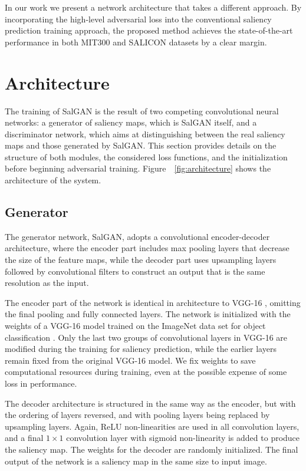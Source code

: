 \documentclass[times,twocolumn,final,authoryear]{elsarticle}
\begin{document}
In our work we present a network architecture that takes a different approach. By incorporating the high-level adversarial loss into the conventional saliency prediction training approach, the proposed method achieves the state-of-the-art performance in both MIT300 and SALICON datasets by a clear margin.

\section{Architecture}
\label{sec:Architecture}

The training of SalGAN is the result of two competing convolutional neural networks: a generator of saliency maps, which is SalGAN itself, and a discriminator network, which aims at distinguishing between the real saliency maps and those generated by SalGAN. This section provides details on the structure of both modules, the considered loss functions, and the initialization before beginning adversarial training.
Figure~~\ref{fig:architecture} shows the architecture of the system.

\subsection{Generator}
\label{ssec:Saliency Prediction Network}

The generator network, SalGAN, adopts a convolutional encoder-decoder architecture, where the encoder part includes max pooling layers that decrease the size of the feature maps, while the decoder part uses upsampling layers followed by convolutional filters to construct an output that is the same resolution as the input. 

The encoder part of the network is identical in architecture to VGG-16 \citep{simonyan2014very}, omitting the final pooling and fully connected layers. The network is initialized with the weights of a VGG-16 model trained on the ImageNet data set for object classification \citep{deng2009imagenet}. Only the last two groups of convolutional layers in VGG-16 are modified during the training for saliency prediction, while the earlier layers remain fixed from the original VGG-16 model. We fix weights to save computational resources during training, even at the possible expense of some loss in performance.

The decoder architecture is structured in the same way as the encoder, but with the ordering of layers reversed, and with pooling layers being replaced by upsampling layers. Again, ReLU non-linearities are used in all convolution layers, and a final $1\times 1$ convolution layer with sigmoid non-linearity is added to produce the saliency map. The weights for the decoder are randomly initialized. The final output of the network is a saliency map in the same size to input image.
\end{document}
